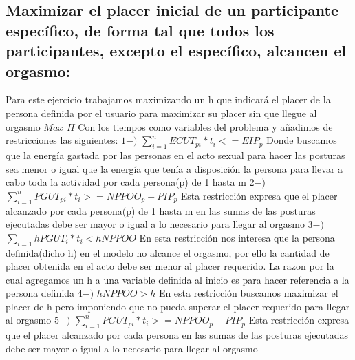 \documentclass{llncs}
\begin{document}
\subsection{Maximizar el placer inicial de un participante específico, de forma tal que todos los participantes, excepto el específico, alcancen el orgasmo:}
Para este ejercicio trabajamos maximizando un h que indicará el placer de la persona definida por el usuario para maximizar su placer sin que llegue al orgasmo
\newline
\newline
$Max$ $H$
\newline
\newline
Con los tiempos como variables del problema y añadimos de restricciones las siguientes:
\newline
\newline
$1-)$ $\sum_{i = 1}^{n} ECUT_{pi}*t_{i} <= EIP_{p}$
\newline
\newline
Donde buscamos que la energía gastada por las personas en el acto sexual para hacer las posturas sea menor o igual que la energía que tenía a disposición la persona para llevar a cabo toda la actividad por cada persona(p) de 1 hasta m
\newline
\newline
$2-)$ $\sum_{i = 1}^{n} PGUT_{pi}*t_{i} >= NPPOO_{p} - PIP_{p}$
\newline
\newline
Esta restricción expresa que el placer alcanzado por cada persona(p) de 1 hasta m en las sumas de las posturas ejecutadas debe ser mayor o igual a lo necesario para llegar al orgasmo
\newline
\newline
$3-)$ $\sum_{i = 1} hPGUT_{i}*t_{i} < hNPPOO$
\newline
\newline
En esta restricción nos interesa que la persona definida(dicho h) en el modelo no alcance el orgasmo, por ello la cantidad de placer obtenida en el acto debe ser menor al placer requerido. La razon por la cual agregamos un h a una variable definida al inicio es para hacer referencia a la persona definida
\newline
\newline
$4-)$ $hNPPOO > h$
\newline
\newline
En esta restricción buscamos maximizar el placer de h pero imponiendo que no pueda superar el placer requerido para llegar al orgasmo
\newline
\newline
$5-)$ $\sum_{i = 1}^{n} PGUT_{pi}*t_{i} >= NPPOO_{p} - PIP_{p}$
\newline
\newline
Esta restricción expresa que el placer alcanzado por cada persona en las sumas de las posturas ejecutadas debe ser mayor o igual a lo necesario para llegar al orgasmo
\end{document}
